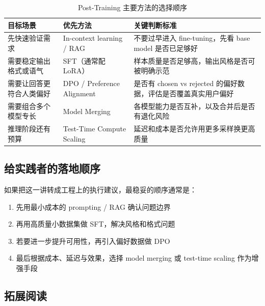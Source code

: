 \begin{table}[H]
\centering
\begin{tabular}{p{} p{} p{}}
\toprule
目标场景 & 优先方法 & 关键判断标准 \\
\midrule
先快速验证需求 & In-context learning / RAG & 不要过早进入 fine-tuning，先看 base model 是否已足够好 \\
需要稳定输出格式或语气 & SFT（通常配 LoRA） & 样本质量是否足够高，输出风格是否可被明确示范 \\
需要让回答更符合人类偏好 & DPO / Preference Alignment & 是否有 chosen vs rejected 的偏好数据，评估是否覆盖真实用户偏好 \\
需要组合多个模型专长 & Model Merging & 各模型能力是否互补，以及合并后是否有退化风险 \\
推理阶段还有预算 & Test-Time Compute Scaling & 延迟和成本是否允许用更多采样换更高质量 \\
\bottomrule
\end{tabular}
\caption{Post-Training 主要方法的选择顺序}
\end{table}

\subsection{给实践者的落地顺序}

如果把这一讲转成工程上的执行建议，最稳妥的顺序通常是：

\begin{enumerate}
    \item 先用最小成本的 prompting / RAG 确认问题边界
    \item 再用高质量小数据集做 SFT，解决风格和格式问题
    \item 若要进一步提升可用性，再引入偏好数据做 DPO
    \item 最后根据成本、延迟与效果，选择 model merging 或 test-time scaling 作为增强手段
\end{enumerate}

\subsection{拓展阅读}

